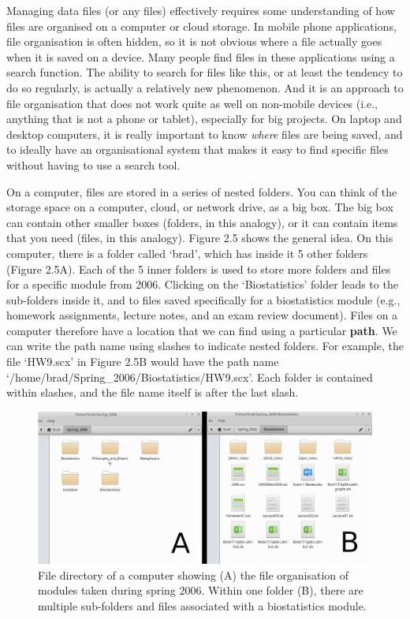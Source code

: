 \documentclass[
]{scrbook}
\begin{document}
Managing data files (or any files) effectively requires some understanding of how files are organised on a computer or cloud storage.
In mobile phone applications, file organisation is often hidden, so it is not obvious where a file actually goes when it is saved on a device.
Many people find files in these applications using a search function.
The ability to search for files like this, or at least the tendency to do so regularly, is actually a relatively new phenomenon.
And it is an approach to file organisation that does not work quite as well on non-mobile devices (i.e., anything that is not a phone or tablet), especially for big projects.
On laptop and desktop computers, it is really important to know \emph{where} files are being saved, and to ideally have an organisational system that makes it easy to find specific files without having to use a search tool.

On a computer, files are stored in a series of nested folders.
You can think of the storage space on a computer, cloud, or network drive, as a big box.
The big box can contain other smaller boxes (folders, in this analogy), or it can contain items that you need (files, in this analogy).
Figure 2.5 shows the general idea.
On this computer, there is a folder called `brad', which has inside it 5 other folders (Figure 2.5A).
Each of the 5 inner folders is used to store more folders and files for a specific module from 2006.
Clicking on the `Biostatistics' folder leads to the sub-folders inside it, and to files saved specifically for a biostatistics module (e.g., homework assignments, lecture notes, and an exam review document).
Files on a computer therefore have a location that we can find using a particular \textbf{path}.
We can write the path name using slashes to indicate nested folders.
For example, the file `HW9.scx' in Figure 2.5B would have the path name `/home/brad/Spring\_2006/Biostatistics/HW9.scx'.
Each folder is contained within slashes, and the file name itself is after the last slash.

\begin{figure}
\includegraphics[width=1\linewidth]{img/directory_eg} \caption{File directory of a computer showing (A) the file organisation of modules taken during spring 2006. Within one folder (B), there are multiple sub-folders and files associated with a biostatistics module.}\label{fig:unnamed-chunk-8}
\end{figure}
\end{document}
